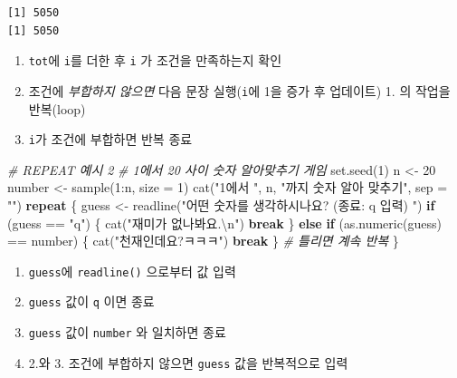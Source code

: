 \documentclass[
  11pt,
]{krantz}
\makeatletter
\newenvironment{Shaded}{\begin{snugshade}}{\end{snugshade}}
\newcommand{\AttributeTok}[1]{\textcolor[rgb]{0.61,0.61,0.61}{#1}}
\newcommand{\CommentTok}[1]{\textcolor[rgb]{0.37,0.37,0.37}{\textit{#1}}}
\newcommand{\ControlFlowTok}[1]{\textcolor[rgb]{0.27,0.27,0.27}{\textbf{#1}}}
\newcommand{\DecValTok}[1]{\textcolor[rgb]{0.06,0.06,0.06}{#1}}
\newcommand{\FunctionTok}[1]{\textcolor[rgb]{0,0,0}{#1}}
\newcommand{\NormalTok}[1]{#1}
\newcommand{\OtherTok}[1]{\textcolor[rgb]{0.37,0.37,0.37}{#1}}
\newcommand{\SpecialCharTok}[1]{\textcolor[rgb]{0,0,0}{#1}}
\newcommand{\StringTok}[1]{\textcolor[rgb]{0.5,0.5,0.5}{#1}}
\providecommand{\tightlist}{%
  \setlength{\itemsep}{0pt}\setlength{\parskip}{0pt}}
\newenvironment{kframe}{%
\medskip{}
\setlength{\fboxsep}{.8em}
 \def\at@end@of@kframe{}%
 \ifinner\ifhmode%
  \def\at@end@of@kframe{\end{minipage}}%
  \begin{minipage}{\columnwidth}%
 \fi\fi%
 \def\FrameCommand##1{\hskip\@totalleftmargin \hskip-\fboxsep
 \colorbox{shadecolor}{##1}\hskip-\fboxsep
     \hskip-\linewidth \hskip-\@totalleftmargin \hskip\columnwidth}%
 \MakeFramed {\advance\hsize-\width
   \@totalleftmargin\z@ \linewidth\hsize
   \@setminipage}}%
 {\par\unskip\endMakeFramed%
 \at@end@of@kframe}
\renewenvironment{quote}{\begin{kframe}}{\end{kframe}}
\makeatother
\begin{document}
\begin{verbatim}
[1] 5050
[1] 5050
\end{verbatim}

\normalsize

\begin{quote}
\begin{enumerate}
\def\labelenumi{\arabic{enumi}.}
\tightlist
\item
  \texttt{tot}에 \texttt{i}를 더한 후 \texttt{i} 가 조건을 만족하는지 확인
\item
  조건에 \emph{부합하지 않으면} 다음 문장 실행(\texttt{i}에 1을 증가 후 업데이트) 1. 의 작업을 반복(loop)
\item
  \texttt{i}가 조건에 부합하면 반복 종료
\end{enumerate}
\end{quote}

\footnotesize

\begin{Shaded}
\begin{Highlighting}[]
\CommentTok{\# REPEAT 예시 2}
\CommentTok{\# 1에서 20 사이 숫자 알아맞추기 게임}
\FunctionTok{set.seed}\NormalTok{(}\DecValTok{1}\NormalTok{)}
\NormalTok{n }\OtherTok{\textless{}{-}} \DecValTok{20}
\NormalTok{number }\OtherTok{\textless{}{-}} \FunctionTok{sample}\NormalTok{(}\DecValTok{1}\SpecialCharTok{:}\NormalTok{n, }\AttributeTok{size =} \DecValTok{1}\NormalTok{)}
\FunctionTok{cat}\NormalTok{(}\StringTok{"1에서 "}\NormalTok{, n, }\StringTok{"까지 숫자 알아 맞추기"}\NormalTok{, }\AttributeTok{sep =} \StringTok{""}\NormalTok{)}
\ControlFlowTok{repeat}\NormalTok{ \{}
\NormalTok{  guess }\OtherTok{\textless{}{-}} \FunctionTok{readline}\NormalTok{(}\StringTok{"어떤 숫자를 생각하시나요? (종료: q 입력) "}\NormalTok{)}
  \ControlFlowTok{if}\NormalTok{ (guess }\SpecialCharTok{==} \StringTok{"q"}\NormalTok{) \{}
    \FunctionTok{cat}\NormalTok{(}\StringTok{"재미가 없나봐요.}\SpecialCharTok{\textbackslash{}n}\StringTok{"}\NormalTok{)}
    \ControlFlowTok{break}
\NormalTok{  \} }\ControlFlowTok{else} \ControlFlowTok{if}\NormalTok{ (}\FunctionTok{as.numeric}\NormalTok{(guess) }\SpecialCharTok{==}\NormalTok{ number) \{}
    \FunctionTok{cat}\NormalTok{(}\StringTok{"천재인데요?ㅋㅋㅋ"}\NormalTok{)}
    \ControlFlowTok{break}
\NormalTok{  \}}
  \CommentTok{\# 틀리면 계속 반복}
\NormalTok{\}}
\end{Highlighting}
\end{Shaded}

\normalsize

\begin{quote}
\begin{enumerate}
\def\labelenumi{\arabic{enumi}.}
\tightlist
\item
  \texttt{guess}에 \texttt{readline()} 으로부터 값 입력
\item
  \texttt{guess} 값이 \texttt{q} 이면 종료
\item
  \texttt{guess} 값이 \texttt{number} 와 일치하면 종료
\item
  2.와 3. 조건에 부합하지 않으면 \texttt{guess} 값을 반복적으로 입력
\end{enumerate}
\end{quote}
\end{document}
